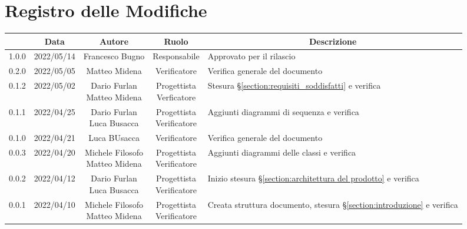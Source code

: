 \thispagestyle{empty}
\section*{Registro delle Modifiche}

\begin{center}
	\renewcommand{\arraystretch}{1.8}
	\begin{longtable}[c]{c | c | c | c | p{5cm}}
		\rowcolor[HTML]{125E28}
		\multicolumn{1}{c}{\color[HTML]{FFFFFF} \textbf{Versione}} &
		\multicolumn{1}{c}{\color[HTML]{FFFFFF} \textbf{Data}}     &
		\multicolumn{1}{c}{\color[HTML]{FFFFFF} \textbf{Autore}}   &
		\multicolumn{1}{c}{\color[HTML]{FFFFFF} \textbf{Ruolo}}    &
		\multicolumn{1}{c}{\color[HTML]{FFFFFF} \textbf{Descrizione}} \\
		\endhead
		1.0.0 & 2022/05/14 & Francesco Bugno & Responsabile & Approvato per il rilascio \\ 
		0.2.0 & 2022/05/05 & Matteo Midena & Verificatore & Verifica generale del documento\\ 
		0.1.2 & 2022/05/02 & \Longunderstack{Dario Furlan\\Matteo Midena} & \Longunderstack{Progettista\\Verficatore}& Stesura §\ref{section:requisiti_soddisfatti} e verifica\\ 
		0.1.1 & 2022/04/25 & \Longunderstack{Dario Furlan\\Luca Busacca} & \Longunderstack{Progettista \\ Verificatore} & Aggiunti diagrammi di sequenza e verifica\\
		0.1.0 & 2022/04/21 & Luca BUsacca & Verificatore & Verifica generale del documento\\
		0.0.3 & 2022/04/20 & \Longunderstack{Michele Filosofo \\ Matteo Midena} & \Longunderstack{Progettista\\Verificatore} & Aggiunti diagrammi delle classi e verifica\\ 
		0.0.2 & 2022/04/12 & \Longunderstack{Dario Furlan \\ Luca Busacca} & \Longunderstack{Progettista \\ Verificatore} & Inizio stesura §\ref{section:architettura del prodotto} e verifica \\
		0.0.1 & 2022/04/10 & \Longunderstack{Michele Filosofo \\ Matteo Midena} & \Longunderstack{Progettista \\ Verificatore} & Creata struttura documento, stesura §\ref{section:introduzione} e verifica\\ 
	\end{longtable}
\end{center}
